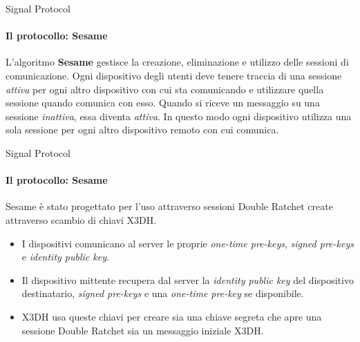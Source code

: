 \begin{frame}{Signal Protocol}
    \framesubtitle{Il protocollo: Sesame}

    L'algoritmo \textbf{Sesame} gestisce la creazione, eliminazione e utilizzo delle sessioni di comunicazione.\newline\pause
    Ogni dispositivo degli utenti deve tenere traccia di una sessione \textit{attiva} per ogni altro dispositivo con cui sta comunicando e utilizzare quella sessione quando comunica con esso.
    Quando si riceve un messaggio su una sessione \textit{inattiva}, essa diventa \textit{attiva}.\pause\newline
    In questo modo ogni dispositivo utilizza una sola sessione per ogni altro dispositivo remoto con cui comunica. 
    \cite{sesame}

\end{frame}

\begin{frame}{Signal Protocol}
    \framesubtitle{Il protocollo: Sesame}
    Sesame è stato progettato per l'uso attraverso sessioni Double Ratchet create attraverso scambio di chiavi X3DH.

    \begin{itemize}
        \item I dispositivi comunicano al server le proprie \textit{one-time pre-keys}, \textit{signed pre-keys} e \textit{identity public key}.\pause
        \item Il dispositivo mittente recupera dal server la \textit{identity public key} del dispositivo destinatario, \textit{signed pre-keys} e una \textit{one-time pre-key} se disponibile.\pause
        \item X3DH usa queste chiavi per creare sia una chiave segreta che apre una sessione Double Ratchet sia un messaggio iniziale X3DH.
    \end{itemize}    

\end{frame}


